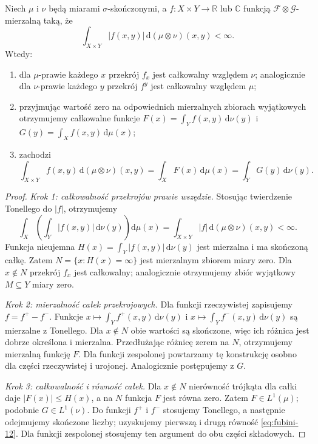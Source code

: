 \begin{twierdzenie}[Fubini]
\label{thm:fubini-12}
Niech $\mu$ i $\nu$ będą miarami $\sigma$-skończonymi,
a $f:X\times Y\to\mathbb R$ lub $\mathbb C$ funkcją
$\mathcal F\otimes\mathcal G$-mierzalną taką, że
\begin{equation}\label{eq:abs-fubini-12}
\int_{X\times Y}|f(x,y)|\,\mathrm d(\mu\otimes\nu)(x,y)<\infty.
\end{equation}
Wtedy:
\begin{enumerate}[label=\textup{(\roman*)}]
\item dla $\mu$-prawie każdego $x$ przekrój $f_x$ jest
      całkowalny względem $\nu$; analogicznie dla
      $\nu$-prawie każdego $y$ przekrój $f^y$ jest
      całkowalny względem $\mu$;
\item przyjmując wartość zero na odpowiednich
      mierzalnych zbiorach wyjątkowych otrzymujemy
      całkowalne funkcje
      $F(x)=\int_Y f(x,y)\,\mathrm d\nu(y)$ i
      $G(y)=\int_X f(x,y)\,\mathrm d\mu(x)$;
\item zachodzi
\begin{equation}\label{eq:fubini-12}
\int_{X\times Y}f(x,y)\,\mathrm d(\mu\otimes\nu)(x,y)
=\int_XF(x)\,\mathrm d\mu(x)
=\int_YG(y)\,\mathrm d\nu(y).
\end{equation}
\end{enumerate}
\end{twierdzenie}
\begin{proof}
\emph{Krok 1: całkowalność przekrojów prawie wszędzie.}
Stosując twierdzenie Tonellego do $|f|$,
otrzymujemy
\[
\int_X\left(\int_Y|f(x,y)|\,\mathrm d\nu(y)\right)
\mathrm d\mu(x)
=\int_{X\times Y}|f|\,\mathrm d(\mu\otimes\nu)(x,y)<\infty.
\]
Funkcja nieujemna $H(x)=\int_Y|f(x,y)|\,\mathrm d\nu(y)$
jest mierzalna i ma skończoną całkę. Zatem
$N=\{x:H(x)=\infty\}$ jest mierzalnym zbiorem
miary zero. Dla $x\notin N$ przekrój $f_x$
jest całkowalny; analogicznie otrzymujemy zbiór
wyjątkowy $M\subseteq Y$ miary zero.

\emph{Krok 2: mierzalność całek przekrojowych.}
Dla funkcji rzeczywistej zapisujemy $f=f^+-f^-$.
Funkcje $x\mapsto\int_Y f^+(x,y)\,\mathrm d\nu(y)$
i $x\mapsto\int_Y f^-(x,y)\,\mathrm d\nu(y)$
są mierzalne z Tonellego. Dla $x\notin N$
obie wartości są skończone, więc ich różnica
jest dobrze określona i mierzalna. Przedłużając
różnicę zerem na $N$, otrzymujemy mierzalną
funkcję $F$. Dla funkcji zespolonej powtarzamy
tę konstrukcję osobno dla części rzeczywistej
i urojonej. Analogicznie postępujemy z $G$.

\emph{Krok 3: całkowalność i równość całek.}
Dla $x\notin N$ nierówność trójkąta dla całki
daje $|F(x)|\le H(x)$, a na $N$ funkcja $F$
jest równa zero. Zatem $F\in L^1(\mu)$;
podobnie $G\in L^1(\nu)$.
Do funkcji $f^+$ i $f^-$ stosujemy Tonellego,
a następnie odejmujemy skończone liczby;
uzyskujemy pierwszą i drugą równość
\eqref{eq:fubini-12}. Dla funkcji zespolonej
stosujemy ten argument do obu części składowych.
\end{proof}

